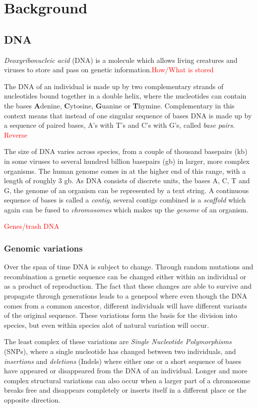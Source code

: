 \documentclass[thesis.tex]{subfiles}
\begin{document}
\chapter{Background}
\section{DNA}
\textit{Deoxyribonucleic acid} (DNA) is a molecule which allows living creatures and viruses to store and pass on genetic information.\textcolor{red}{How/What is stored}
\par\noindent
The DNA of an individual is made up by two complementary strands of nucleotides bound together in a double helix, where the nucleotides can contain the bases \textbf{A}denine, \textbf{C}ytosine, \textbf{G}uanine or \textbf{T}hymine. Complementary in this context means that instead of one singular sequence of bases DNA is made up by a sequence of paired bases, A's with T's and C's with G's, called \textit{base pairs}. \textcolor{red}{Reverse}\\
\par\noindent
The size of DNA varies across species, from a couple of thousand basepairs (kb) in some viruses to several hundred billion basepairs (gb) in larger, more complex organisms. The human genome comes in at the higher end of this range, with a length of roughly 3 gb. As DNA consists of discrete units, the bases A, C, T and G, the genome of an organism can be represented by a text string. A continuous sequence of bases is called a \textit{contig}, several contigs combined is a \textit{scaffold} which again can be fused to \textit{chromosomes} which makes up the \textit{genome} of an organism.\\
\par\noindent
\textcolor{red}{Genes/trash DNA}
\subsection{Genomic variations}
Over the span of time DNA is subject to change. Through random mutations and recombination a genetic sequence can be changed either within an individual or as a product of reproduction. The fact that these changes are able to survive and propagate through generations leads to a genepool where even though the DNA comes from a common ancestor, different individuals will have different variants of the original sequence. These variations form the basis for the division into species, but even within species alot of natural variation will occur.\\
\par\noindent
The least complex of these variations are \textit{Single Nucleotide Polymorphisms} (SNPs), where a single nucleotide has changed between two individuals, and \textit{insertions} and \textit{deletions} (Indels) where either one or a short sequence of bases have appeared or disappeared from the DNA of an individual. Longer and more complex structural variations can also occur when a larger part of a chromosome breaks free and disappears completely or inserts itself in a different place or the opposite direction.
\end{document}
